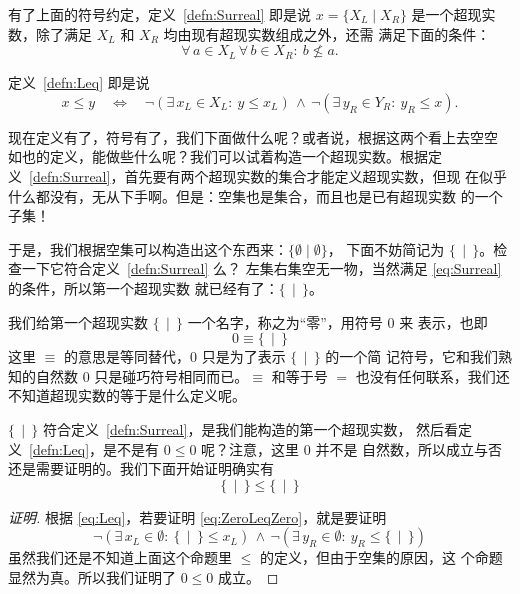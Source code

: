 \documentclass[cs4size,a4paper,adobefonts]{ctexart}
\numberwithin{equation}{section}
\begin{document}
有了上面的符号约定，定义~\ref{defn:Surreal} 即是说 $x=\{X_L \mid X_R\}$
是一个超现实数，除了满足 $X_L$ 和 $X_R$ 均由现有超现实数组成之外，还需
满足下面的条件：
\begin{equation}
  \label{eq:Surreal}
  \forall\, a \in X_L \,\forall\, b \in X_R:\: b\nleq a.
\end{equation}

定义~\ref{defn:Leq} 即是说
\begin{equation}
  \label{eq:Leq}
  x \leq y \quad\Leftrightarrow\quad
  \neg(\exists\, x_L \in X_L :\: y \leq x_L)\, \wedge \,
  \neg(\exists\, y_R \in Y_R :\: y_R \leq x).
\end{equation}

现在定义有了，符号有了，我们下面做什么呢？或者说，根据这两个看上去空空
如也的定义，能做些什么呢？我们可以试着构造一个超现实数。根据定
义~\ref{defn:Surreal}，首先要有两个超现实数的集合才能定义超现实数，但现
在似乎什么都没有，无从下手啊。但是：空集也是集合，而且也是已有超现实数
的一个子集！

于是，我们根据空集可以构造出这个东西来：$\{\emptyset\mid\emptyset\}$，
下面不妨简记为 $\{\,\mid\,\}$。检查一下它符合定义~\ref{defn:Surreal} 么？
左集右集空无一物，当然满足 \eqref{eq:Surreal} 的条件，所以第一个超现实数
就已经有了：$\{\,\mid\,\}$。

我们给第一个超现实数 $\{\,\mid\,\}$ 一个名字，称之为“零”，用符号 $0$ 来
表示，也即
\begin{equation}
  \label{eq:defZero}
  0 \equiv \{\,\mid\,\}
\end{equation}
这里 $\equiv$ 的意思是等同替代，0 只是为了表示 $\{\,\mid\,\}$ 的一个简
记符号，它和我们熟知的自然数 0 只是碰巧符号相同而已。$\equiv$ 和等于号
$=$ 也没有任何联系，我们还不知道超现实数的等于是什么定义呢。

$\{\,\mid\,\}$ 符合定义~\ref{defn:Surreal}，是我们能构造的第一个超现实数，
然后看定义~\ref{defn:Leq}，是不是有 $0 \leq 0$ 呢？注意，这里 $0$ 并不是
自然数，所以成立与否还是需要证明的。我们下面开始证明确实有
\begin{equation}
  \label{eq:ZeroLeqZero}
  \{\,\mid\,\}\leq\{\,\mid\,\}
\end{equation}

\begin{proof}[证明]
  根据 \eqref{eq:Leq}，若要证明 \eqref{eq:ZeroLeqZero}，就是要证明
  \[
  \neg(\exists\,x_L\in\emptyset:\:\{\,\mid\,\}\leq x_L)\,\wedge\,
  \neg(\exists\,y_R\in\emptyset:\:y_R\leq\{\,\mid\,\})
  \]
  虽然我们还是不知道上面这个命题里 $\leq$ 的定义，但由于空集的原因，这
  个命题显然为真。所以我们证明了 $0\leq0$ 成立。
\end{proof}
\end{document}
